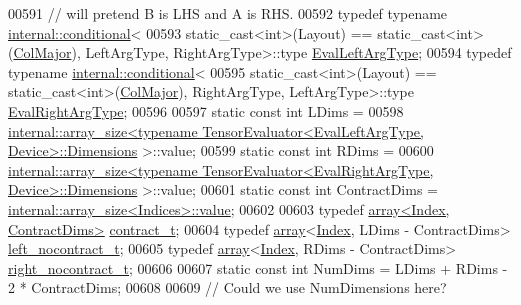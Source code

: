 \begin{DoxyCode}
00591   \textcolor{comment}{// will pretend B is LHS and A is RHS.}
00592   \textcolor{keyword}{typedef} \textcolor{keyword}{typename} \hyperlink{struct_eigen_1_1internal_1_1conditional}{internal::conditional}<
00593     \textcolor{keyword}{static\_cast<}\textcolor{keywordtype}{int}\textcolor{keyword}{>}(Layout) == static\_cast<int>(\hyperlink{group__enums_ggaacded1a18ae58b0f554751f6cdf9eb13a0cbd4bdd0abcfc0224c5fcb5e4f6669a}{ColMajor}), LeftArgType, RightArgType>::type 
      \hyperlink{class_eigen_1_1internal_1_1_tensor_lazy_evaluator_writable}{EvalLeftArgType};
00594   \textcolor{keyword}{typedef} \textcolor{keyword}{typename} \hyperlink{struct_eigen_1_1internal_1_1conditional}{internal::conditional}<
00595     \textcolor{keyword}{static\_cast<}\textcolor{keywordtype}{int}\textcolor{keyword}{>}(Layout) == static\_cast<int>(\hyperlink{group__enums_ggaacded1a18ae58b0f554751f6cdf9eb13a0cbd4bdd0abcfc0224c5fcb5e4f6669a}{ColMajor}), RightArgType, LeftArgType>::type 
      \hyperlink{class_eigen_1_1internal_1_1_tensor_lazy_evaluator_writable}{EvalRightArgType};
00596 
00597   \textcolor{keyword}{static} \textcolor{keyword}{const} \textcolor{keywordtype}{int} LDims =
00598       
      \hyperlink{struct_eigen_1_1internal_1_1array__size}{internal::array\_size<typename TensorEvaluator<EvalLeftArgType, Device>::Dimensions}
      >::value;
00599   \textcolor{keyword}{static} \textcolor{keyword}{const} \textcolor{keywordtype}{int} RDims =
00600       
      \hyperlink{struct_eigen_1_1internal_1_1array__size}{internal::array\_size<typename TensorEvaluator<EvalRightArgType, Device>::Dimensions}
      >::value;
00601   \textcolor{keyword}{static} \textcolor{keyword}{const} \textcolor{keywordtype}{int} ContractDims = \hyperlink{struct_eigen_1_1internal_1_1array__size}{internal::array\_size<Indices>::value};
00602 
00603   \textcolor{keyword}{typedef} \hyperlink{class_eigen_1_1array}{array<Index, ContractDims>} \hyperlink{class_eigen_1_1array}{contract\_t};
00604   \textcolor{keyword}{typedef} \hyperlink{class_eigen_1_1array}{array}<\hyperlink{namespace_eigen_a62e77e0933482dafde8fe197d9a2cfde}{Index}, LDims - ContractDims> \hyperlink{class_eigen_1_1array}{left\_nocontract\_t};
00605   \textcolor{keyword}{typedef} \hyperlink{class_eigen_1_1array}{array}<\hyperlink{namespace_eigen_a62e77e0933482dafde8fe197d9a2cfde}{Index}, RDims - ContractDims> \hyperlink{class_eigen_1_1array}{right\_nocontract\_t};
00606 
00607   \textcolor{keyword}{static} \textcolor{keyword}{const} \textcolor{keywordtype}{int} NumDims = LDims + RDims - 2 * ContractDims;
00608 
00609   \textcolor{comment}{// Could we use NumDimensions here?}

\end{DoxyCode}
